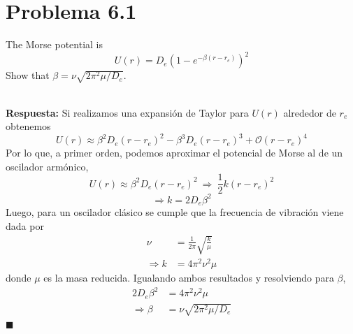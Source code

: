 \documentclass[]{article}
\numberwithin{equation}{section}
\newcommand{\0}{\textcolor{gray}{0}}
\newcommand{\qed}{\hfill\(\blacksquare\)}
\newcommand{\resp}{
	\\
	
	\textbf{Respuesta:} }
\begin{document}
\section{Problema 6.1}
The Morse potential is
\begin{equation}
	U(r) = D_e \left(1 - e^{-\beta(r - r_e)}\right)^2
\end{equation}
Show that $\beta = \nu\sqrt{2\pi^2\mu/D_e}$.
\resp Si realizamos una expansión de Taylor para $U(r)$ alrededor de $r_e$ obtenemos
\begin{equation}
	U(r) \approx \beta ^2 D_e (r-r_e)^2 - \beta ^3 D_e (r-r_e)^3 + \mathcal{O}\left(r-r_e\right)^4
\end{equation}
Por lo que, a primer orden, podemos aproximar el potencial de Morse al de un oscilador armónico,
\begin{equation*}
	U(r) \approx \beta ^2 D_e (r-r_e)^2 ~\Rightarrow~ \frac{1}{2} k (r-r_e)^2
\end{equation*}
\begin{equation}
	\Rightarrow k = 2 D_e \beta^2
\end{equation}
Luego, para un oscilador clásico se cumple que la frecuencia de vibración viene dada por
\begin{align}
	\nu &= \frac{1}{2\pi} \sqrt{\frac{k}{\mu}} \nonumber\\
	\Rightarrow k &= 4\pi^2 \nu^2 \mu
\end{align}
donde $\mu$ es la masa reducida. Igualando ambos resultados y resolviendo para $\beta$,
\begin{align}
	2 D_e \beta^2 &= 4\pi^2 \nu^2 \mu \nonumber\\
	\Rightarrow \beta &= \nu\sqrt{2\pi^2\mu/D_e}
\end{align}
\qed

\end{document}

